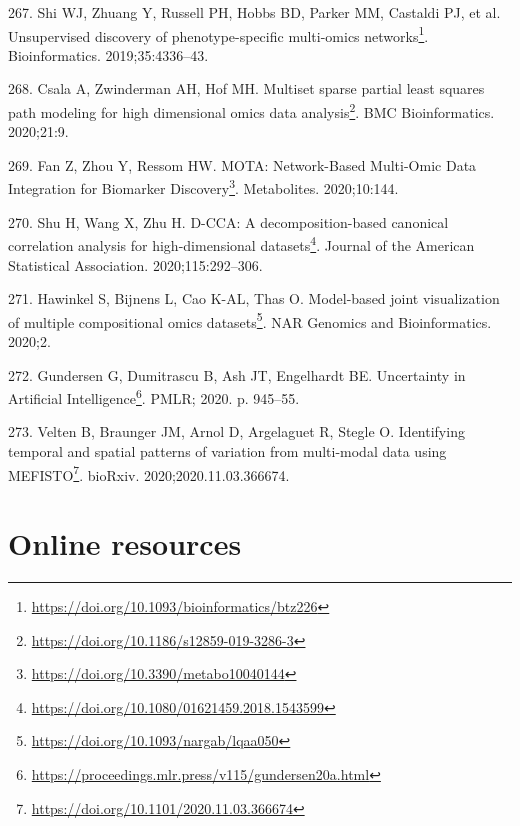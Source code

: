 \documentclass[
  a4paper,
]{book}
\DeclareRobustCommand{\href}[2]{#2\footnote{\url{#1}}}
\newlength{\cslhangindent}
\newlength{\cslentryspacingunit} %
\newenvironment{CSLReferences}[2] %
 {%
  \setlength{\parindent}{0pt}
  \ifodd #1
  \let\oldpar\par
  \def\par{\hangindent=\cslhangindent\oldpar}
  \fi
  \setlength{\parskip}{#2\cslentryspacingunit}
 }%
 {}
\begin{document}
\begin{CSLReferences}{0}{0}
\leavevmode{}%
267. Shi WJ, Zhuang Y, Russell PH, Hobbs BD, Parker MM, Castaldi PJ, et al. \href{https://doi.org/10.1093/bioinformatics/btz226}{Unsupervised discovery of phenotype-specific multi-omics networks}. Bioinformatics. 2019;35:4336--43.

\leavevmode{}%
268. Csala A, Zwinderman AH, Hof MH. \href{https://doi.org/10.1186/s12859-019-3286-3}{Multiset sparse partial least squares path modeling for high dimensional omics data analysis}. BMC Bioinformatics. 2020;21:9.

\leavevmode{}%
269. Fan Z, Zhou Y, Ressom HW. \href{https://doi.org/10.3390/metabo10040144}{MOTA: Network-Based Multi-Omic Data Integration for Biomarker Discovery}. Metabolites. 2020;10:144.

\leavevmode{}%
270. Shu H, Wang X, Zhu H. \href{https://doi.org/10.1080/01621459.2018.1543599}{D-CCA: A decomposition-based canonical correlation analysis for high-dimensional datasets}. Journal of the American Statistical Association. 2020;115:292--306.

\leavevmode{}%
271. Hawinkel S, Bijnens L, Cao K-AL, Thas O. \href{https://doi.org/10.1093/nargab/lqaa050}{Model-based joint visualization of multiple compositional omics datasets}. NAR Genomics and Bioinformatics. 2020;2.

\leavevmode{}%
272. Gundersen G, Dumitrascu B, Ash JT, Engelhardt BE. \href{https://proceedings.mlr.press/v115/gundersen20a.html}{Uncertainty in Artificial Intelligence}. PMLR; 2020. p. 945--55.

\leavevmode{}%
273. Velten B, Braunger JM, Arnol D, Argelaguet R, Stegle O. \href{https://doi.org/10.1101/2020.11.03.366674}{Identifying temporal and spatial patterns of variation from multi-modal data using MEFISTO}. bioRxiv. 2020;2020.11.03.366674.

\end{CSLReferences}

\hypertarget{appendix-appendix}{%
\appendix {}}


\hypertarget{online-resources}{%
\chapter{Online resources}\label{online-resources}}
\end{document}
